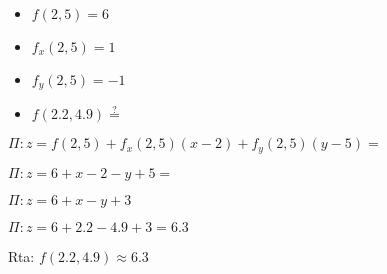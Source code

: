 \documentclass[../practica_04.tex]{subfiles}
\begin{document}
    \begin{itemize}
        \item $f(2,5) = 6$
        \item $f_x(2,5) = 1$
        \item $f_y(2,5) = -1$
        \item $f(2.2,4.9) \stackrel{?}{=} $
    \end{itemize}

        $ \Pi: z = f(2,5) + f_x(2,5)(x-2) + f_y(2,5)(y-5) = $

        $ \Pi: z = 6 + x-2 - y + 5 = $

        $ \Pi: z = 6 + x - y + 3$

        $ \Pi: z = 6 + 2.2 - 4.9 + 3 = 6.3 $

        Rta: $ f(2.2,4.9) \approx 6.3$
\end{document}
